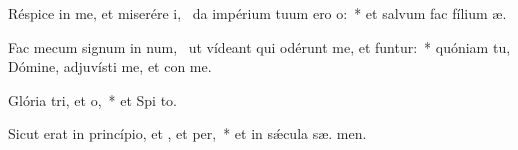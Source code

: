 \item Réspice in me, et miserére i,~\pscross{} da impérium tuum ero o:~* et salvum fac fílium  æ.
\item Fac mecum signum in num,~\pscross{} ut vídeant qui odérunt me, et funtur:~* quóniam tu, Dómine, adjuvísti me, et con  me.
\item Glória tri, et o,~* et Spi to.
\item Sicut erat in princípio, et , et per,~* et in sǽcula sæ. men.
